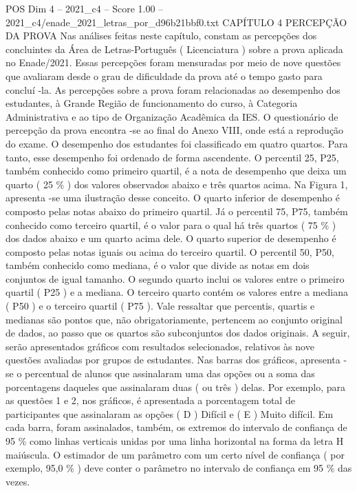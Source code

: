 \begin{textsample}{POS Dim 4 – 2021\_c4 – Score 1.00 – 2021\_c4/enade\_2021\_letras\_por\_d96b21bbf0.txt}  \label{ex:f4_pos_140}
CAPÍTULO 4 PERCEPÇÃO DA PROVA Nas análises feitas neste capítulo, constam as percepções dos concluintes da Área de Letras-Português ( Licenciatura ) sobre a prova aplicada no Enade/2021.
Essas percepções foram mensuradas por meio de nove questões que avaliaram desde o grau de dificuldade da prova até o tempo gasto para concluí -la.
As percepções sobre a prova foram relacionadas ao desempenho dos estudantes, à Grande Região de funcionamento do curso, à Categoria Administrativa e ao tipo de Organização Acadêmica da IES.
O questionário de percepção da prova encontra -se ao final do Anexo VIII, onde está a reprodução do exame.
O desempenho dos estudantes foi classificado em quatro quartos.
Para tanto, esse desempenho foi ordenado de forma ascendente.
O percentil 25, P25, também conhecido como primeiro quartil, é a nota de desempenho que deixa um quarto ( 25 \% ) dos valores observados abaixo e três quartos acima.
Na Figura 1, apresenta -se uma ilustração desse conceito.
O quarto inferior de desempenho é composto pelas notas abaixo do primeiro quartil.
Já o percentil 75, P75, também conhecido como terceiro quartil, é o valor para o qual há três quartos ( 75 \% ) dos dados abaixo e um quarto acima dele.
O quarto superior de desempenho é composto pelas notas iguais ou acima do terceiro quartil.
O percentil 50, P50, também conhecido como mediana, é o valor que divide as notas em dois conjuntos de igual tamanho.
O segundo quarto inclui os valores entre o primeiro quartil ( P25 ) e a mediana.
O terceiro quarto contém os valores entre a mediana ( P50 ) e o terceiro quartil ( P75 ).
Vale ressaltar que percentis, quartis e medianas são pontos que, não obrigatoriamente, pertencem ao conjunto original de dados, ao passo que os quartos são subconjuntos dos dados originais.
A seguir, serão apresentados gráficos com resultados selecionados, relativos às nove questões avaliadas por grupos de estudantes.
Nas barras dos gráficos, apresenta -se o percentual de alunos que assinalaram uma das opções ou a soma das porcentagens daqueles que assinalaram duas ( ou três ) delas.
Por exemplo, para as questões 1 e 2, nos gráficos, é apresentada a porcentagem total de participantes que assinalaram as opções ( D ) Difícil e ( E ) Muito difícil.
Em cada barra, foram assinalados, também, os extremos do intervalo de confiança de 95 \% como linhas verticais unidas por uma linha horizontal na forma da letra H maiúscula.
O estimador de um parâmetro com um certo nível de confiança ( por exemplo, 95,0 \% ) deve conter o parâmetro no intervalo de confiança em 95 \% das vezes.

\end{textsample}
